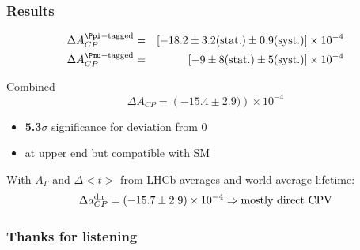\documentclass[18pt, aspectratio=169]{beamer}
\newcommand{\kitemph}[1]{\textcolor{kit-green100}{\bf{#1}}}
\begin{document}
\begin{frame}
  \frametitle{Results}
  \begin{eqnarray*}
    \Delta A_{CP}^{\Ppi-\mathrm{tagged}} & = & \left[-18.2 \pm 3.2 (\mathrm{stat.}) \pm 0.9
                                               (\mathrm{syst.} )\right] \times 10^{-4} \\
    \Delta A_{CP}^{\Pmu-\mathrm{tagged}} & = & \left[-9 \pm 8 (\mathrm{stat.}) \pm 5
                                               (\mathrm{syst.} )\right] \times 10^{-4} \\
  \end{eqnarray*}

  \begin{block}{Combined}
    \begin{equation*}
          \Delta A_{CP} = \left(-15.4 \pm 2.9)\right) \times 10^{-4}
        \end{equation*}
        \begin{itemize}
        \item \kitemph{5.3$\sigma$} significance for deviation from 0
        \item at upper end but compatible with SM
        \end{itemize}
\end{block}
With $A_\Gamma$ and $\Delta <t>$ from LHCb averages and world average \PDzero lifetime:
\begin{equation*}
  \Delta a_{CP}^{\rm dir} = \left(-15.7 \pm 2.9\right) \times 10^{-4} \Rightarrow \text{mostly direct CPV}
\end{equation*}

\end{frame}

\begin{frame}
  \frametitle{Thanks for listening}
  
\end{frame}
\end{document}
